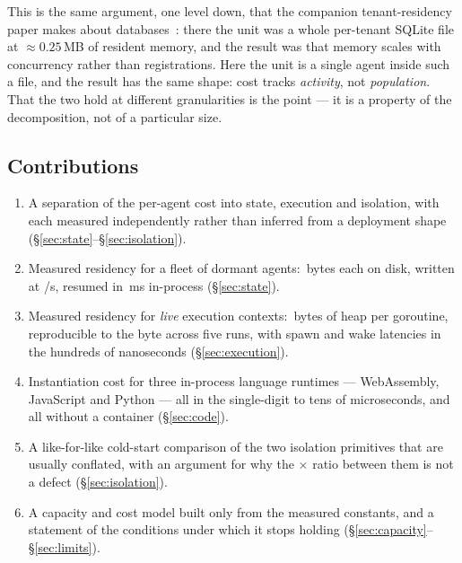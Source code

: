 This is the same argument, one level down, that the companion tenant-residency
paper makes about databases~\cite{unifiedtenant}: there the unit was a whole
per-tenant SQLite file at ${\approx}0.25$\,MB of resident memory, and the result
was that memory scales with concurrency rather than registrations. Here the unit
is a single agent inside such a file, and the result has the same shape: cost
tracks \emph{activity}, not \emph{population}. That the two hold at different
granularities is the point --- it is a property of the decomposition, not of a
particular size.

\subsection*{Contributions}

\begin{enumerate}[leftmargin=*]
\item A separation of the per-agent cost into state, execution and isolation,
  with each measured independently rather than inferred from a deployment shape
  (\S\ref{sec:state}--\S\ref{sec:isolation}).
\item Measured residency for a fleet of \rFleetAgents{} dormant agents:
  \rFleetPer{}\,bytes each on disk, written at \rFleetRate{}/s, resumed in
  \rFleetResume{}\,ms in-process (\S\ref{sec:state}).
\item Measured residency for \rFleetAgents{} \emph{live} execution contexts:
  \rGoPer{}\,bytes of heap per goroutine, reproducible to the byte across five
  runs, with spawn and wake latencies in the hundreds of nanoseconds
  (\S\ref{sec:execution}).
\item Instantiation cost for three in-process language runtimes --- WebAssembly,
  JavaScript and Python --- all in the single-digit to tens of microseconds, and
  all without a container (\S\ref{sec:code}).
\item A like-for-like cold-start comparison of the two isolation primitives that
  are usually conflated, with an argument for why the \rVmRatio{}$\times$ ratio
  between them is not a defect (\S\ref{sec:isolation}).
\item A capacity and cost model built only from the measured constants, and a
  statement of the conditions under which it stops holding
  (\S\ref{sec:capacity}--\S\ref{sec:limits}).
\end{enumerate}

